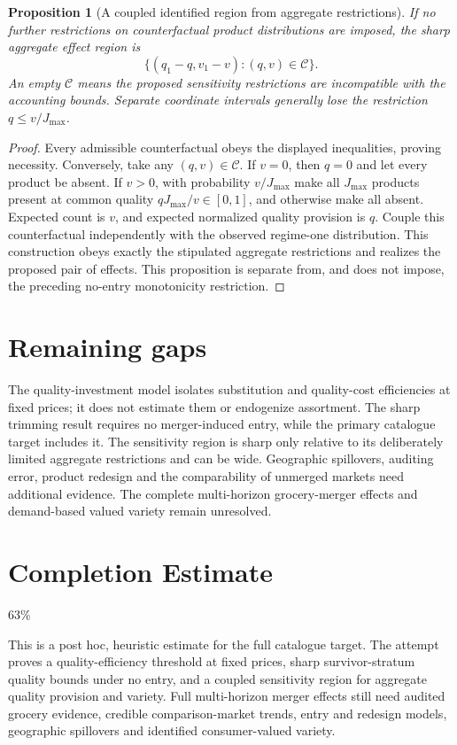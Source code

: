 \documentclass[11pt,a4paper]{article}
\newtheorem{proposition}[theorem]{Proposition}
\theoremstyle{definition}
\theoremstyle{remark}
\begin{document}
\begin{proposition}[A coupled identified region from aggregate restrictions]
If no further restrictions on counterfactual product distributions are imposed, the sharp aggregate effect region is
\[
 \{(q_1-q,v_1-v):(q,v)\in\mathcal C\}.
\]
An empty $\mathcal C$ means the proposed sensitivity restrictions are incompatible with the accounting bounds. Separate coordinate intervals generally lose the restriction $q\leq v/J_{\max}$.
\end{proposition}
\begin{proof}
Every admissible counterfactual obeys the displayed inequalities, proving necessity. Conversely, take any $(q,v)\in\mathcal C$. If $v=0$, then $q=0$ and let every product be absent. If $v>0$, with probability $v/J_{\max}$ make all $J_{\max}$ products present at common quality $qJ_{\max}/v\in[0,1]$, and otherwise make all absent. Expected count is $v$, and expected normalized quality provision is $q$. Couple this counterfactual independently with the observed regime-one distribution. This construction obeys exactly the stipulated aggregate restrictions and realizes the proposed pair of effects. This proposition is separate from, and does not impose, the preceding no-entry monotonicity restriction.
\end{proof}

\section{Remaining gaps}
The quality-investment model isolates substitution and quality-cost efficiencies at fixed prices; it does not estimate them or endogenize assortment. The sharp trimming result requires no merger-induced entry, while the primary catalogue target includes it. The sensitivity region is sharp only relative to its deliberately limited aggregate restrictions and can be wide. Geographic spillovers, auditing error, product redesign and the comparability of unmerged markets need additional evidence. The complete multi-horizon grocery-merger effects and demand-based valued variety remain unresolved.

\section{Completion Estimate}
63\%

This is a post hoc, heuristic estimate for the full catalogue target.
The attempt proves a quality-efficiency threshold at fixed prices, sharp survivor-stratum quality bounds under no entry, and a coupled sensitivity region for aggregate quality provision and variety. Full multi-horizon merger effects still need audited grocery evidence, credible comparison-market trends, entry and redesign models, geographic spillovers and identified consumer-valued variety.
\end{document}
